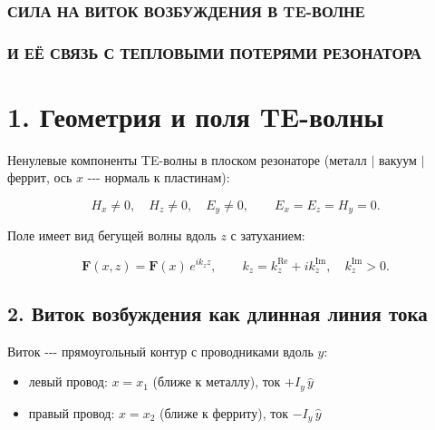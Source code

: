 \documentclass[11pt]{article}
\providecommand{\tightlist}{%
      \setlength{\itemsep}{0pt}\setlength{\parskip}{0pt}}
\begin{document}
    \subsubsection{СИЛА НА ВИТОК ВОЗБУЖДЕНИЯ В
TE-ВОЛНЕ}\label{ux441ux438ux43bux430-ux43dux430-ux432ux438ux442ux43eux43a-ux432ux43eux437ux431ux443ux436ux434ux435ux43dux438ux44f-ux432-te-ux432ux43eux43bux43dux435}

\subsubsection{И ЕЁ СВЯЗЬ С ТЕПЛОВЫМИ ПОТЕРЯМИ
РЕЗОНАТОРА}\label{ux438-ux435ux451-ux441ux432ux44fux437ux44c-ux441-ux442ux435ux43fux43bux43eux432ux44bux43cux438-ux43fux43eux442ux435ux440ux44fux43cux438-ux440ux435ux437ux43eux43dux430ux442ux43eux440ux430}

\section{1. Геометрия и поля
TE-волны}\label{ux433ux435ux43eux43cux435ux442ux440ux438ux44f-ux438-ux43fux43eux43bux44f-te-ux432ux43eux43bux43dux44b}

Ненулевые компоненты TE-волны в плоском резонаторе (металл \(|\) вакуум
\(|\) феррит, ось \(x\) -\/-\/- нормаль к пластинам):

\begin{equation*}
    H_x \neq 0,\quad H_z \neq 0,\quad E_y \neq 0,
    \qquad
    E_x = E_z = H_y = 0.
\end{equation*}

Поле имеет вид бегущей волны вдоль \(z\) с затуханием:

\begin{equation*}
    \mathbf{F}(x,z) = \mathbf{F}(x)\,e^{ik_z z},
    \qquad
    k_z = k_z^{\mathrm{Re}} + i k_z^{\mathrm{Im}},\quad k_z^{\mathrm{Im}} > 0.
\end{equation*}

    \subsection{2. Виток возбуждения как длинная линия
тока}\label{ux432ux438ux442ux43eux43a-ux432ux43eux437ux431ux443ux436ux434ux435ux43dux438ux44f-ux43aux430ux43a-ux434ux43bux438ux43dux43dux430ux44f-ux43bux438ux43dux438ux44f-ux442ux43eux43aux430}

Виток -\/-\/- прямоугольный контур с проводниками вдоль \(y\):

\begin{itemize}
\tightlist
\item
  левый провод: \(x = x_1\) (ближе к металлу), ток \(+I_y\,\hat{y}\)
\item
  правый провод: \(x = x_2\) (ближе к ферриту), ток \(-I_y\,\hat{y}\)
\end{itemize}
\end{document}
